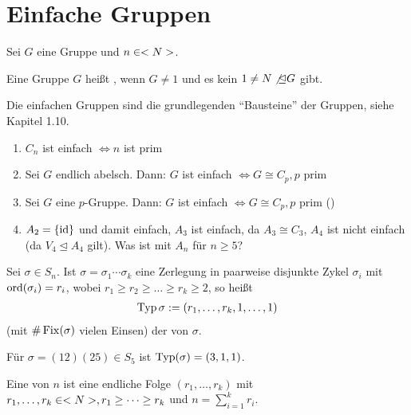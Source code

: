 \section{Einfache Gruppen}

Sei $G$ eine Gruppe und $n \in <N>$.

\begin{definition}
	Eine Gruppe $G$ heißt , wenn $G \neq 1$ und es kein $1 \neq N \not\unlhd G$ gibt. %
\end{definition}

\begin{remark}
	Die einfachen Gruppen sind die grundlegenden ``Bausteine'' der Gruppen, siehe Kapitel 1.10.
\end{remark}

\begin{example}
	\begin{enumerate}
		\item $C_n$ ist einfach $\Leftrightarrow n$ ist prim
		\item Sei $G$ endlich abelsch. Dann: $G$ ist einfach $\Leftrightarrow G \cong C_p, p$ prim
		\item Sei $G$ eine $p$-Gruppe. Dann: $G$ ist einfach $\Leftrightarrow G \cong C_p, p$ prim ()
		\item $A_2 = \{\operatorname{id}\}$ und damit einfach, $A_3$ ist einfach, da $A_3 \cong C_3$, $A_4$ ist nicht einfach (da $V_4 \unlhd A_4$ gilt). Was ist mit $A_n$ für $n \geq 5$?
	\end{enumerate}
\end{example}

\begin{definition}[Typ]
	Sei $\sigma \in S_n$. Ist $\sigma = \sigma_1\cdots \sigma_k$ eine Zerlegung in paarweise disjunkte Zykel $\sigma_i$ mit $\operatorname{ord}(\sigma_i)=r_i$, wobei $r_1 \geq r_2 \geq \dots \geq r_k \geq 2$, so heißt
	\begin{align}
	\operatorname{Typ}{\sigma} := (r_1,\dots,r_k,1,\dots,1)\notag
	\end{align}
	(mit $\#\operatorname{Fix}(\sigma)$ vielen Einsen) der  von $\sigma$.
\end{definition}

\begin{example}
	Für $\sigma = (12)(25) \in S_5$ ist $\operatorname{Typ}(\sigma) = (3,1,1)$.
\end{example}

\begin{definition}[Partition]
	Eine  von $n$ ist eine endliche Folge $(r_1,\dots,r_k)$ mit $r_1,\dots,r_k \in <N>,r_1\geq\dots\geq r_k$ und $n = \sum_{i=1}^{k} r_i$.
\end{definition}

